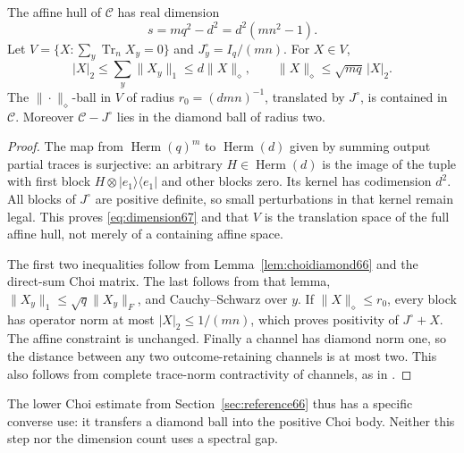 \begin{lemma}\label{lem:affine67}
The affine hull of $\mathcal C$ has real dimension
\begin{equation}\label{eq:dimension67}
 s=mq^2-d^2=d^2(mn^2-1).
\end{equation}
Let $V=\{X:\sum_y\operatorname{Tr}_n X_y=0\}$ and
$J^\circ_y=I_q/(mn)$. For $X\in V$,
\begin{equation}\label{eq:normequi67}
 |X|_2\le\sum_y\|X_y\|_1\le d\|X\|_{\diamond},\qquad
 \|X\|_{\diamond}\le\sqrt{mq}\,|X|_2.
\end{equation}
The $\|\cdot\|_{\diamond}$-ball in $V$ of radius
$r_0=(dmn)^{-1}$, translated by $J^\circ$, is contained in $\mathcal C$.
Moreover $\mathcal C-J^\circ$ lies in the diamond ball of radius two.
\end{lemma}
\begin{proof}
The map from $\operatorname{Herm}(q)^m$ to $\operatorname{Herm}(d)$
given by summing output partial traces is surjective: an arbitrary
$H\in\operatorname{Herm}(d)$ is the image of the tuple with first block
$H\otimes|e_1\rangle\langle e_1|$ and other blocks zero. Its kernel has
codimension $d^2$. All blocks of $J^\circ$ are positive definite, so
small perturbations in that kernel remain legal. This proves
\eqref{eq:dimension67} and that $V$ is the translation space of the
full affine hull, not merely of a containing affine space.

The first two inequalities follow from Lemma~\ref{lem:choidiamond66}
and the direct-sum Choi matrix. The last follows from that lemma,
$\|X_y\|_1\le\sqrt q\|X_y\|_F$, and Cauchy--Schwarz over $y$.
If $\|X\|_{\diamond}\le r_0$, every block has operator norm at most
$|X|_2\le1/(mn)$, which proves positivity of $J^\circ+X$.
The affine constraint is unchanged. Finally a channel has diamond norm
one, so the distance between any two outcome-retaining channels is at
most two. This also follows from complete trace-norm contractivity of
channels, as in \cite[Corollary~3.40]{Watrous65}.
\end{proof}
The lower Choi estimate from Section~\ref{sec:reference66} thus has a
specific converse use: it transfers a diamond ball into the positive
Choi body. Neither this step nor the dimension count uses a spectral gap.

